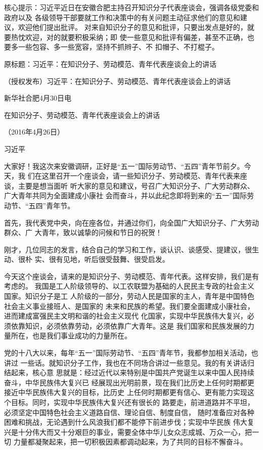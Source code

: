 \documentclass[11pt]{ctexart}
\begin{document}
{{{{核心提示：习近平近日在安徽合肥主持召开知识分子代表座谈会，强调各级党委和政府以及
各级领导干部要就工作和决策中的有关问题主动征求他们的意见和建议，欢迎他们提出批评。
对来自知识分子的意见和批评，只要出发点是好的，就要热忱欢迎，对的就要积极采纳；即
使一些意见和批评有偏差，甚至不正确，也要多一些包容、多一些宽容，坚持不抓辫子、不
扣帽子、不打棍子。

原标题：习近平：在知识分子、劳动模范、青年代表座谈会上的讲话

（授权发布）习近平：在知识分子、劳动模范、青年代表座谈会上的讲话

新华社合肥4月30日电

在知识分子、劳动模范、青年代表座谈会上的讲话

（2016年4月26日）

习近平

大家好！我这次来安徽调研，正好是“五一”国际劳动节、“五四”青年节前夕。今天，我
们在这里召开一个座谈会，请一些知识分子、劳动模范、青年代表来座谈，主要是想当面听
听大家的意见和建议，号召广大知识分子、广大劳动群众、广大青年共同为全面建成小康社
会而奋斗，并以此纪念即将到来的“五一”国际劳动节、“五四”青年节。

首先，我代表党中央，向在座各位，并通过你们，向全国广大知识分子、广大劳动群众、广
大青年，致以诚挚的问候和节日的祝贺！

刚才，几位同志的发言，结合自己的学习和工作，谈认识、谈感受、提建议，很生动、很朴
实、很有见地，听后很受鼓舞、很受启发。

今天这个座谈会，请来的是知识分子、劳动模范、青年代表。这样安排，我们是有考虑的。
我国是工人阶级领导的、以工农联盟为基础的人民民主专政的社会主义国家。知识分子是工
人阶级的一部分，劳动人民是国家的主人，青年是中国特色社会主义事业接班人、是国家的
未来和民族的希望。我们要全面建成小康社会，进而建成富强民主文明和谐的社会主义现代
化国家，实现中华民族伟大复兴，必须依靠知识，必须依靠劳动，必须依靠广大青年。这是
我们国家和民族发展的力量所在，也是我们事业成功的力量所在。

党的十八大以来，每年“五一”国际劳动节、“五四”青年节，我都参加相关活动，也讲过
一些话。就知识分子工作，我也在不同场合讲过一些意见。我的有关讲话归结起来，核心意
思就是：经过近代以来特别是中国共产党诞生以来中国人民持续奋斗，中华民族伟大复兴已
经展现出光明前景，现在我们比历史上任何时期都更接近中华民族伟大复兴的目标，比历史
上任何时期都更有信心、更有能力实现这个目标。同时，实现中华民族伟大复兴还有很长的
路要走，前进道路并不平坦，必须坚定中国特色社会主义道路自信、理论自信、制度自信，
随时准备应对各种困难和挑战，无论遇到什么风浪我们都不能停下前进步伐；实现中华民族
伟大复兴是十分伟大而又十分艰巨的事业，需要全体中华儿女众志成城、万众一心，把一切
力量都凝聚起来，把一切积极因素都调动起来，为了共同的目标不懈奋斗。

}}}}
\end{document}
